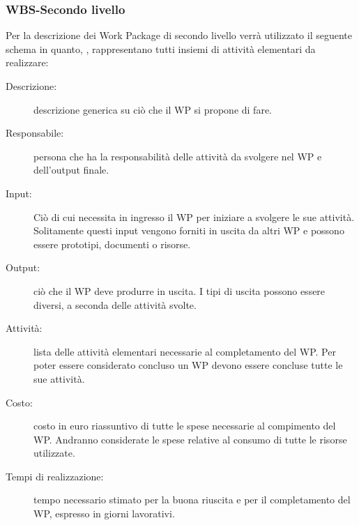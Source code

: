 \subsubsection {WBS-Secondo livello}
Per la descrizione dei Work Package di secondo livello verr\`{a} utilizzato il seguente schema in quanto,
, rappresentano tutti insiemi di attivit\`{a} elementari da realizzare:
\begin{description}
\item[Descrizione:] descrizione generica su ci\`{o} che il WP si propone di fare.
\item[Responsabile:] persona che ha la responsabilit\`{a} delle attivit\`{a} da svolgere nel WP e dell'output finale.
\item[Input:] Ci\`{o} di cui necessita in ingresso il WP per iniziare a svolgere le sue attivit\`{a}. Solitamente questi input vengono forniti in uscita da altri WP e possono essere prototipi, documenti o risorse.
\item[Output:] ci\`{o} che il WP deve produrre in uscita. I tipi di uscita possono essere diversi, a seconda delle attivit\`{a} svolte.
\item[Attivit\`{a}:] lista delle attivit\`{a} elementari necessarie al completamento del WP. Per poter essere considerato concluso un WP devono essere concluse tutte le sue attivit\`{a}.
\item[Costo:] costo in euro riassuntivo di tutte le spese necessarie al compimento del WP. Andranno considerate le spese relative al consumo di tutte le risorse utilizzate.
\item[Tempi di realizzazione:] tempo necessario stimato per la buona riuscita e per il completamento del WP, espresso in giorni lavorativi.
\end{description}

